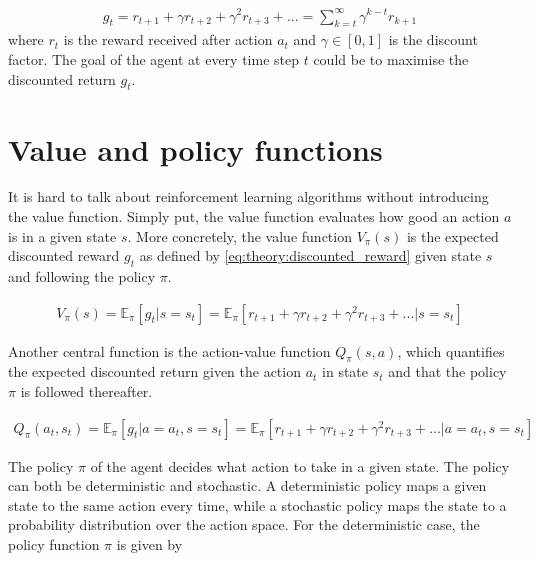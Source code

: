 \documentclass[class=book, crop=false]{standalone}
\begin{document}
\begin{equation}
   \begin{aligned}\label{eq:theory:discounted_reward}
g_{t} = r_{t+1} + \gamma r_{t+2} + \gamma^{2} r_{t+3} + ...
= \sum_{k=t}^{\infty} \gamma^{k-t}r_{k+1}
\end{aligned} 
\end{equation}
where $r_{t}$ is the reward received after action $a_{t}$ and $\gamma \in [0,1]$ is the discount factor. The goal of the agent at every time step $t$ could be to maximise the discounted return $g_{t}$.



\section{Value and policy functions}
It is hard to talk about reinforcement learning algorithms without introducing the value function. Simply put, the value function evaluates how good an action $a$ is in a given state $s$. More concretely, the value function $V_{\pi}(s)$ is the expected discounted reward $g_{t}$ as defined by \eqref{eq:theory:discounted_reward} given state $s$ and following the policy $\pi$.

\begin{equation}
   \begin{aligned}\label{eq:theory:value_function}
V_{\pi}(s) 
= \mathbb{E}_{\pi}[g_{t}| s=s_{t}]
= \mathbb{E}_{\pi}[ r_{t+1} + \gamma r_{t+2} + \gamma^{2} r_{t+3} + ...|s=s_{t}]
\end{aligned} 
\end{equation}

Another central function is the action-value function $Q_{\pi}(s,a)$, which quantifies the expected discounted return given the action $a_{t}$ in state $s_{t}$ and that the policy $\pi$ is followed thereafter. 

\begin{equation}
   \begin{aligned}\label{eq:theory:action_value_function}
Q_{\pi}(a_{t},s_{t}) 
= \mathbb{E}_{\pi}[g_{t}|a=a_{t} ,s=s_{t}]
= \mathbb{E}_{\pi}[ r_{t+1} + \gamma r_{t+2} + \gamma^{2} r_{t+3} + ...|a=a_{t} ,s=s_{t}]
\end{aligned} 
\end{equation}

The policy $\pi$ of the agent decides what action to take in a given state. The policy can both be deterministic and stochastic. A deterministic policy maps a given state to the same action every time, while a stochastic policy maps the state to a probability distribution over the action space. For the deterministic case, the policy function $\pi$ is given by
\end{document}
